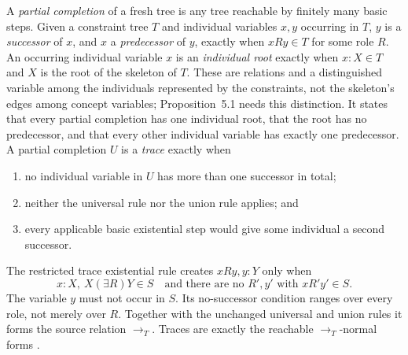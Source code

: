 A \emph{partial completion} of a fresh tree is any tree reachable by finitely
many basic steps.  Given a constraint tree \(T\) and individual variables
\(x,y\) occurring in \(T\), \(y\) is a \emph{successor} of \(x\), and \(x\) a
\emph{predecessor} of \(y\), exactly when \(xRy\in T\) for some role \(R\).
An occurring individual variable \(x\) is an \emph{individual root} exactly
when \(x:X\in T\) and \(X\) is the root of the skeleton of \(T\).  These are
relations and a distinguished variable among the individuals represented by
the constraints, not the skeleton's edges among concept variables;
Proposition~5.1 needs this distinction.  It states that every partial
completion has one individual root,
that the root has no predecessor, and that every other individual variable has
exactly one predecessor.  A partial completion \(U\) is a \emph{trace} exactly
when
\begin{enumerate}
\item no individual variable in \(U\) has more than one successor in total;
\item neither the universal rule nor the union rule applies; and
\item every applicable basic existential step would give some individual a
      second successor.
\end{enumerate}
The restricted trace existential rule creates \(xRy,y:Y\) only when
\[
 x:X,\ X(\exists R)Y\in S
 \quad\text{and there are no }R',y'\text{ with }xR'y'\in S.
\]
The variable \(y\) must not occur in \(S\).  Its no-successor condition ranges
over every role, not merely over \(R\).
Together with the unchanged universal and union rules it forms the source
relation \(\to_T\).  Traces are exactly the reachable \(\to_T\)-normal forms
\cite[\S5, pp.~14--15]{SchmidtSchaussSmolka1991}.

